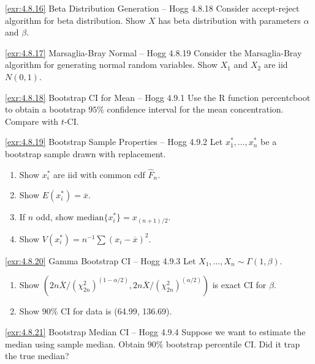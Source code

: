 \begin{exercise}{\ref{exr:4.8.16} Beta Distribution Generation – Hogg 4.8.18}\label{exr:4.8.16}
Consider accept-reject algorithm for beta distribution. Show $X$ has beta distribution with parameters $\alpha$ and $\beta$.
\end{exercise}

\begin{exercise}{\ref{exr:4.8.17} Marsaglia-Bray Normal – Hogg 4.8.19}\label{exr:4.8.17}
Consider the Marsaglia-Bray algorithm for generating normal random variables. Show $X_1$ and $X_2$ are iid $N(0,1)$.
\end{exercise}

\begin{exercise}{\ref{exr:4.8.18} Bootstrap CI for Mean – Hogg 4.9.1}\label{exr:4.8.18}
Use the R function percentcboot to obtain a bootstrap $95\%$ confidence interval for the mean concentration. Compare with $t$-CI.
\end{exercise}

\begin{exercise}{\ref{exr:4.8.19} Bootstrap Sample Properties – Hogg 4.9.2}\label{exr:4.8.19}
Let $x_1^*, \ldots, x_n^*$ be a bootstrap sample drawn with replacement.
\begin{enumerate}
\item[(a)] Show $x_i^*$ are iid with common cdf $\widehat{F}_n$.
\item[(b)] Show $E(x_i^*) = \overline{x}$.
\item[(c)] If $n$ odd, show $\text{median}\{x_i^*\} = x_{(n+1)/2}$.
\item[(d)] Show $V(x_i^*) = n^{-1}\sum(x_i-\overline{x})^2$.
\end{enumerate}
\end{exercise}

\begin{exercise}{\ref{exr:4.8.20} Gamma Bootstrap CI – Hogg 4.9.3}\label{exr:4.8.20}
Let $X_1,\ldots,X_n \sim \Gamma(1,\beta)$.
\begin{enumerate}
\item[(a)] Show $(2n\overline{X}/(\chi_{2n}^2)^{(1-\alpha/2)}, 2n\overline{X}/(\chi_{2n}^2)^{(\alpha/2)})$ is exact CI for $\beta$.
\item[(b)] Show $90\%$ CI for data is (64.99, 136.69).
\end{enumerate}
\end{exercise}

\begin{exercise}{\ref{exr:4.8.21} Bootstrap Median CI – Hogg 4.9.4}\label{exr:4.8.21}
Suppose we want to estimate the median using sample median. Obtain $90\%$ bootstrap percentile CI. Did it trap the true median?
\end{exercise}

